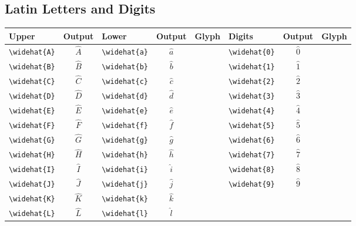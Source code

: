 \documentclass[12pt,a4paper]{article}
\begin{document}
\subsection*{Latin Letters and Digits}
\begin{longtable}{|l|c|l|c|c|l|c|c|}
\hline
\textbf{Upper}     & \textbf{Output} & \textbf{Lower}     & \textbf{Output} & \textbf{Glyph} & \textbf{Digits}    & \textbf{Output} & \textbf{Glyph} \\
\hline
\verb|\widehat{A}| & $\widehat{A}$   & \verb|\widehat{a}| & $\widehat{a}$   &                & \verb|\widehat{0}| & $\widehat{0}$   & \\
\verb|\widehat{B}| & $\widehat{B}$   & \verb|\widehat{b}| & $\widehat{b}$   &                & \verb|\widehat{1}| & $\widehat{1}$   & \\
\verb|\widehat{C}| & $\widehat{C}$   & \verb|\widehat{c}| & $\widehat{c}$   &                & \verb|\widehat{2}| & $\widehat{2}$   & \\
\verb|\widehat{D}| & $\widehat{D}$   & \verb|\widehat{d}| & $\widehat{d}$   &                & \verb|\widehat{3}| & $\widehat{3}$   & \\
\verb|\widehat{E}| & $\widehat{E}$   & \verb|\widehat{e}| & $\widehat{e}$   &                & \verb|\widehat{4}| & $\widehat{4}$   & \\
\verb|\widehat{F}| & $\widehat{F}$   & \verb|\widehat{f}| & $\widehat{f}$   &                & \verb|\widehat{5}| & $\widehat{5}$   & \\
\verb|\widehat{G}| & $\widehat{G}$   & \verb|\widehat{g}| & $\widehat{g}$   &                & \verb|\widehat{6}| & $\widehat{6}$   & \\
\verb|\widehat{H}| & $\widehat{H}$   & \verb|\widehat{h}| & $\widehat{h}$   &                & \verb|\widehat{7}| & $\widehat{7}$   & \\
\verb|\widehat{I}| & $\widehat{I}$   & \verb|\widehat{i}| & $\widehat{i}$   &                & \verb|\widehat{8}| & $\widehat{8}$   & \\
\verb|\widehat{J}| & $\widehat{J}$   & \verb|\widehat{j}| & $\widehat{j}$   &                & \verb|\widehat{9}| & $\widehat{9}$   & \\
\verb|\widehat{K}| & $\widehat{K}$   & \verb|\widehat{k}| & $\widehat{k}$   &                &                    &                 & \\
\verb|\widehat{L}| & $\widehat{L}$   & \verb|\widehat{l}| & $\widehat{l}$   &                &                    &                 & \\

\end{longtable}
\end{document}
